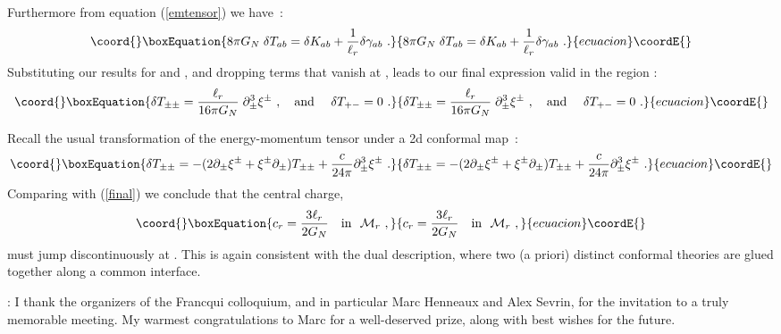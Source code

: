\documentclass[a4paper,12pt,oneside]{article}
\begin{document}
Furthermore from equation (\ref{emtensor}) we have~: 
\begin{equation}\coord{}\boxEquation{
8\pi G_N \; \delta T_{ab} = \delta K_{ab} + 
{1\over \ell_r} \delta\gamma_{ab}\ .
}{
8\pi G_N \; \delta T_{ab} = \delta K_{ab} + 
{1\over \ell_r} \delta\gamma_{ab}\ .
}{ecuacion}\coordE{}\end{equation}
Substituting our  results for \coordHE{} and \coordHE{},
and dropping terms that vanish at \coordHE{},
leads to  our  final expression valid in the region \coordHE{}:
\begin{equation}\coord{}\boxEquation{
\delta T_{\pm\pm} =  {\ell_r \over 16\pi G_N}\;
 \partial_\pm^3 \xi^\pm \ , \ \ \ {\rm and} \ \ \ \
\delta T_{+-} = 0\ . 
\label{final}
}{
\delta T_{\pm\pm} =  {\ell_r \over 16\pi G_N}\;
 \partial_\pm^3 \xi^\pm \ , \ \ \ {\rm and} \ \ \ \
\delta T_{+-} = 0\ . 
}{ecuacion}\coordE{}\end{equation}


  Recall  the usual transformation of
the energy-momentum tensor under a  2d conformal map~:
\begin{equation}\coord{}\boxEquation{
\delta T_{\pm\pm} = - (2\partial_\pm \xi^\pm  +
 \xi^\pm\partial_\pm) T_{\pm\pm} + {c\over 24\pi} \partial^3_\pm \xi^\pm\ . 
}{
\delta T_{\pm\pm} = - (2\partial_\pm \xi^\pm  +
 \xi^\pm\partial_\pm) T_{\pm\pm} + {c\over 24\pi} \partial^3_\pm \xi^\pm\ . 
}{ecuacion}\coordE{}\end{equation}
Comparing with (\ref{final}) we conclude that the 
central charge, 
\begin{equation}\coord{}\boxEquation{
c_r = {3\ell_r\over 2G_N}\ \ \ {\rm in}\ \ {\cal M}_r\ ,
}{
c_r = {3\ell_r\over 2G_N}\ \ \ {\rm in}\ \ {\cal M}_r\ ,
}{ecuacion}\coordE{}\end{equation}
must jump  discontinuously at \myHighlight{$x=0$}\coordHE{}. This is again
consistent with the dual description,  where two (a priori) distinct
conformal theories are glued together along a common interface.  


\vspace{9mm}

:
I thank the organizers of the Francqui colloquium, and in
particular Marc Henneaux and Alex Sevrin, for the invitation
to a truly memorable  meeting. 
My warmest  congratulations  to Marc
for a well-deserved prize, along with  best wishes for the future.  
\end{document}
